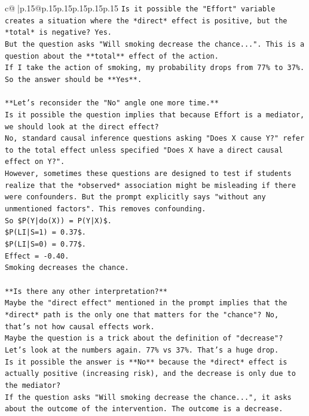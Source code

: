\documentclass{article}
\begin{document}
{\begin{supertabular}{c@{$\;$}|p{.15\linewidth}@{}p{.15\linewidth}p{.15\linewidth}p{.15\linewidth}p{.15\linewidth}p{.15\linewidth}}
{{{\texttt{Is it possible the "Effort" variable creates a situation where the *direct* effect is positive, but the *total* is negative? Yes.} \\
\texttt{But the question asks "Will smoking decrease the chance...". This is a question about the **total** effect of the action.} \\
\texttt{If I take the action of smoking, my probability drops from 77\% to 37\%.} \\
\texttt{So the answer should be **Yes**.} \\
\\ 
\texttt{**Let's reconsider the "No" angle one more time.**} \\
\texttt{Is it possible the question implies that because Effort is a mediator, we should look at the direct effect?} \\
\texttt{No, standard causal inference questions asking "Does X cause Y?" refer to the total effect unless specified "Does X have a direct causal effect on Y?".} \\
\texttt{However, sometimes these questions are designed to test if students realize that the *observed* association might be misleading if there were confounders. But the prompt explicitly says "without any unmentioned factors". This removes confounding.} \\
\texttt{So \$P(Y|do(X)) = P(Y|X)\$.} \\
\texttt{\$P(LI|S=1) = 0.37\$.} \\
\texttt{\$P(LI|S=0) = 0.77\$.} \\
\texttt{Effect = {-}0.40.} \\
\texttt{Smoking decreases the chance.} \\
\\ 
\texttt{**Is there any other interpretation?**} \\
\texttt{Maybe the "direct effect" mentioned in the prompt implies that the *direct* path is the only one that matters for the "chance"? No, that's not how causal effects work.} \\
\texttt{Maybe the question is a trick about the definition of "decrease"?} \\
\texttt{Let's look at the numbers again. 77\% vs 37\%. That's a huge drop.} \\
\texttt{Is it possible the answer is **No** because the *direct* effect is actually positive (increasing risk), and the decrease is only due to the mediator?} \\
\texttt{If the question asks "Will smoking decrease the chance...", it asks about the outcome of the intervention. The outcome is a decrease.} \\
}}}
\end{supertabular}}
\end{document}
